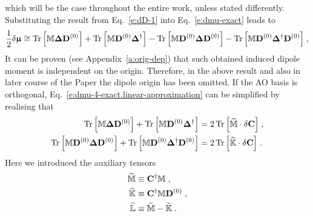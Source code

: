 \documentclass[aip,graphicx]{revtex4-1}
\newcommand{\BM}[1]{\bm{#1}}
\DeclareMathOperator{\Tr}{Tr}
\begin{document}
which will be the case throughout the entire work, unless stated differently.
Substituting the result from Eq.~\eqref{e:dD-1}
into Eq.~\eqref{e:dmu-exact} leads to
%
\begin{equation} \label{e:dmu-4-exact.linear-approximation}
 \frac{1}{2} 
 \delta {\BM{\upmu}}
  \cong
   \Tr{ 
    \left[ 
         {\mathbb{M}} {\BM\Delta} {\bf D}^{(0)}  
    \right] }
%
  +\Tr{ 
    \left[ 
         {\mathbb{M}} {\bf D}^{(0)} {\BM\Delta}^{\dagger}
    \right] }
%
  -\Tr{ 
    \left[ 
         {\mathbb{M}} {\bf D}^{(0)} {\BM\Delta} {\bf D}^{(0)}
    \right] }
%
  -\Tr{ 
    \left[ 
         {\mathbb{M}} {\bf D}^{(0)} {\BM\Delta}^{\dagger} {\bf D}^{(0)}
    \right] } \;,
\end{equation}
%
It can be proven (see Appendix~\ref{a:orig-dep}) that such obtained
induced dipole moment is independent on the origin. Therefore,
in the above result and also in later course of the Paper the dipole origin has been omitted. 
If the AO basis is orthogonal, Eq.~\eqref{e:dmu-4-exact.linear-approximation} can be simplified by realising that
%
\begin{subequations}
 \begin{align}
  \Tr{ 
    \left[ 
         {\mathbb{M}} {\BM\Delta} {\bf D}^{(0)}  
    \right] }
%
  +\Tr{ 
    \left[ 
         {\mathbb{M}} {\bf D}^{(0)} {\BM\Delta}^{\dagger}
    \right] }
  &=
2 \Tr{ 
    \left[ 
         \widetilde{\mathbb{M}} \cdot \delta {\bf C}
   \right] }  \;,
%
\\
%
  \Tr{ 
    \left[ 
         {\mathbb{M}} {\bf D}^{(0)} {\BM\Delta} {\bf D}^{(0)}
    \right] }
%
 +\Tr{ 
    \left[ 
         {\mathbb{M}} {\bf D}^{(0)} {\BM\Delta}^{\dagger} {\bf D}^{(0)}
    \right] }
  &=
2 \Tr{ 
    \left[ 
         \widetilde{\mathbb{K}} \cdot \delta {\bf C}
   \right] } \;.
%
 \end{align}
\end{subequations}
%
Here we introduced the auxiliary tensors
%
\begin{subequations}
 \begin{align}
   \widetilde{\mathbb{M}}  &\equiv {\bf C}^\dagger {\mathbb{M}}     \;,           \\
   \widetilde{\mathbb{K}}  &\equiv {\bf C}^\dagger {\mathbb{M}} {\bf D}^{(0)} \;, \\
   \widetilde{\mathbb{L}}  &\equiv \widetilde{\mathbb{M}} - \widetilde{\mathbb{K}} \;.
 \end{align}
\end{subequations}
\end{document}

